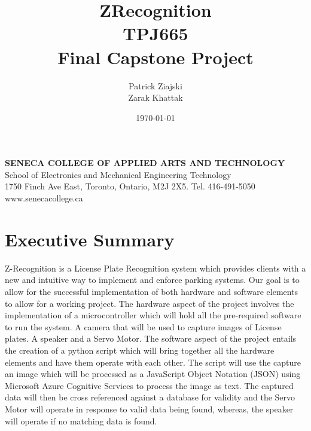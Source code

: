 \documentclass[a4paper,12pt]{article}
\title{ZRecognition\\TPJ665\\Final Capstone Project}
\author{Patrick Ziajski \\ Zarak Khattak}
\date{\today}
\begin{document}
\maketitle
\vfill
\begin{center}
    \textbf{SENECA COLLEGE OF APPLIED ARTS AND TECHNOLOGY}\\School of Electronics and Mechanical Engineering Technology\\1750 Finch Ave East, Toronto, Ontario, M2J 2X5. Tel. 416-491-5050\\www.senecacollege.ca
\end{center}
\thispagestyle{empty}

\newpage
\tableofcontents
\newpage
\listoffigures
\listoftables

\newpage
{}
\section{Executive Summary}
Z-Recognition is a License Plate Recognition system which provides clients with a new and intuitive way to implement and enforce parking systems. Our goal is to allow for the successful implementation of both hardware and software elements to allow for a working project.
The hardware aspect of the project involves the implementation of a microcontroller which will hold all the pre-required software to run the system. A camera that will be used to capture images of License plates. A speaker and a Servo Motor. 
The software aspect of the project entails the creation of a python script which will bring together all the hardware elements and have them operate with each other. The script will use the capture an image which will be processed as a JavaScript Object Notation (JSON) using Microsoft Azure Cognitive Services to process the image as text. The captured data will then be cross referenced against a database for validity and the Servo Motor will operate in response to valid data being found, whereas, the speaker will operate if no matching data is found.

\newpage
\end{document}
